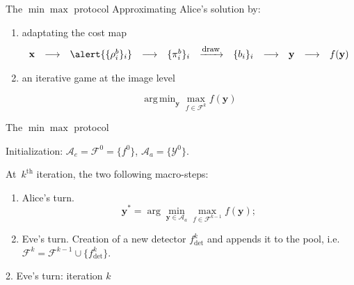 \documentclass[10pt]{beamer}
\newcommand{\fdet}{f_{\mathrm{det}}}
\newcommand{\fset}{\mathcal{F}}
\DeclareMathOperator*{\argmin}{arg\,min} %
\begin{document}
\begin{frame}{The $\min\max$ protocol}
Approximating Alice's solution by: 

\begin{enumerate}
    \item \alert{adaptating the cost map}
\begin{equation*}
\begin{array}{ccccccccccc}
    \mathbf{x} & \longrightarrow & \alert{\{\rho^b_i\}_i} & \longrightarrow & \{\pi_i^b\}_i &   \xrightarrow{\mbox{\footnotesize{draw}}} & \{b_i\}_i &  \longrightarrow & \mathbf{y} &  \longrightarrow & f(\mathbf{y})
\end{array}
\end{equation*}
    
\pause

    \item \alert{an iterative game at the image level}
    
\begin{equation*}
    \argmin_{\mathbf{y}} \max_{f\in\fset^k} f(\mathbf{y})
\end{equation*}

\end{enumerate}
\end{frame}

\begin{frame}{The $\min\max$ protocol}

Initialization: $\mathcal{A}_e = \fset^{0} = \{f^0\}$,  $\mathcal{A}_a = \{\mathcal{Y}^0\}$.
\pause

At~$k^{\mathrm{th}}$ iteration, the two following macro-steps: 
\begin{enumerate}
	\item \alert<2>{Alice's turn.} 
	\begin{equation}
	\mathbf{y}^\ast = \arg \min_{\mathbf{y} \in \mathcal{A}_a} \max_{f \in \fset^{k-1}} f(\mathbf{y});
	\label{eq:stepone}	
	\end{equation}
    \pause
	\item Eve's turn. Creation of a new detector $\fdet^k$ and appends it to the pool, i.e. $\fset^k = \fset^{k-1} \cup \{\fdet^k\}.$
\end{enumerate}
\end{frame}


\begin{frame}{2. Eve's turn: iteration $k$}






\end{frame}
\end{document}
